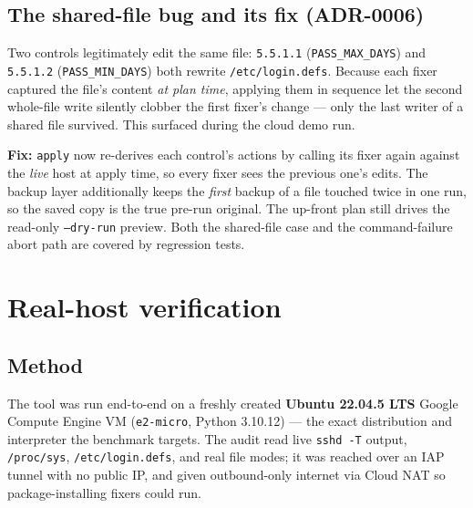 \documentclass[11pt,a4paper]{article}
\begin{document}
\subsection{The shared-file bug and its fix (ADR-0006)}
Two controls legitimately edit the same file: \texttt{5.5.1.1} (\texttt{PASS\_MAX\_DAYS}) and
\texttt{5.5.1.2} (\texttt{PASS\_MIN\_DAYS}) both rewrite \texttt{/etc/login.defs}. Because each
fixer captured the file's content \emph{at plan time}, applying them in sequence let the second
whole-file write silently clobber the first fixer's change --- only the last writer of a shared
file survived. This surfaced during the cloud demo run.

\textbf{Fix:} \texttt{apply} now re-derives each control's actions by calling its fixer again
against the \emph{live} host at apply time, so every fixer sees the previous one's edits. The
backup layer additionally keeps the \emph{first} backup of a file touched twice in one run, so
the saved copy is the true pre-run original. The up-front plan still drives the read-only
\texttt{--dry-run} preview. Both the shared-file case and the command-failure abort path are
covered by regression tests.

\section{Real-host verification}
\subsection{Method}
The tool was run end-to-end on a freshly created \textbf{Ubuntu 22.04.5 LTS} Google Compute
Engine VM (\texttt{e2-micro}, Python 3.10.12) --- the exact distribution and interpreter the
benchmark targets. The audit read live \texttt{sshd -T} output, \texttt{/proc/sys},
\texttt{/etc/login.defs}, and real file modes; it was reached over an IAP tunnel with no public
IP, and given outbound-only internet via Cloud NAT so package-installing fixers could run.
\end{document}
